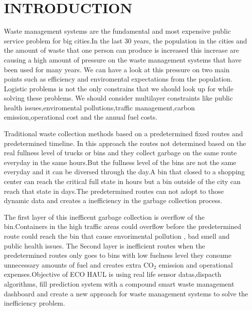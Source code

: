 \documentclass[12pt,a4paper]{report}
\begin{document}

\chapter{INTRODUCTION}
\indent Waste management systems are the fundamental and most expensive public service problem for big cities.In the last 30 years, the population in the cities and the amount of  waste that one person can produce is increased this increase are causing a high amount of pressure on the waste management systems that have been used for many years. We can have a look at this pressure on two main points such as efficiency and enviromental expectations from the population.
Logistic problems is not the only constrains that we should look up for while solving these problems. We should consider multilayer constraints like public health issues,enviromental pollutions,traffic management,carbon emission,operational cost  and the annual fuel costs.

\indent Traditional waste collection methods based on a predetermined fixed routes and predetermined timeline.
In this approach the routes not determined based on the real fullness level of trucks or bins and they collect garbage on the same route everyday in the same hours.But the fullness level of the bins are not the same everyday and it can be diversed through the day.A bin that closed to a shopping center can reach the critical full state in hours but a bin outside of the city can reach that state in days.The predetermined routes can not adopt to those dynamic data and creates a inefficiency in the garbage collection process.

\indent The first layer of this inefficent garbage collection is overflow of the bin.Containers in the high traffic areas could overflow before the predetermined route could reach the bin that cause envorimental pollution , bad smell and public health issues. The Second layer is inefficient routes when the predetermined routes only goes to bins with low fuelness level they consume unnecessary amounts of fuel and creates extra CO$_2$ emission and operational expenses.Objective of ECO HAUL is using real life sensor datas,dispacth algorithms, fill prediction system with a  compound smart waste management dashboard and create a new approach for waste management systems to solve the inefficiency problem.
\end{document}
